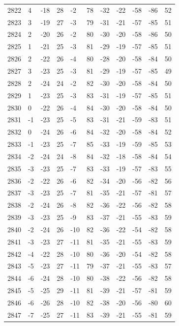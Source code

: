 \begin{table}[H]
\begin{tabular}{lllllllllll}
2822 & 4 & -18 & 28 & -2 & 78 & -32 & -22 & -58 & -86 & 52 \\
2823 & 3 & -19 & 27 & -3 & 79 & -31 & -21 & -57 & -85 & 51 \\
2824 & 2 & -20 & 26 & -2 & 80 & -30 & -20 & -58 & -86 & 50 \\
2825 & 1 & -21 & 25 & -3 & 81 & -29 & -19 & -57 & -85 & 51 \\
2826 & 2 & -22 & 26 & -4 & 80 & -28 & -20 & -58 & -84 & 50 \\
2827 & 3 & -23 & 25 & -3 & 81 & -29 & -19 & -57 & -85 & 49 \\
2828 & 2 & -24 & 24 & -2 & 82 & -30 & -20 & -58 & -84 & 50 \\
2829 & 1 & -23 & 25 & -3 & 83 & -31 & -19 & -57 & -85 & 51 \\
2830 & 0 & -22 & 26 & -4 & 84 & -30 & -20 & -58 & -84 & 50 \\
2831 & -1 & -23 & 25 & -5 & 83 & -31 & -21 & -59 & -83 & 51 \\
2832 & 0 & -24 & 26 & -6 & 84 & -32 & -20 & -58 & -84 & 52 \\
2833 & -1 & -23 & 25 & -7 & 85 & -33 & -19 & -59 & -85 & 53 \\
2834 & -2 & -24 & 24 & -8 & 84 & -32 & -18 & -58 & -84 & 54 \\
2835 & -3 & -23 & 25 & -7 & 83 & -33 & -19 & -57 & -83 & 55 \\
2836 & -2 & -22 & 26 & -6 & 82 & -34 & -20 & -56 & -82 & 56 \\
2837 & -3 & -23 & 25 & -7 & 81 & -35 & -21 & -57 & -81 & 57 \\
2838 & -2 & -24 & 26 & -8 & 82 & -36 & -22 & -56 & -82 & 58 \\
2839 & -3 & -23 & 25 & -9 & 83 & -37 & -21 & -55 & -83 & 59 \\
2840 & -2 & -24 & 26 & -10 & 82 & -36 & -22 & -54 & -82 & 58 \\
2841 & -3 & -23 & 27 & -11 & 81 & -35 & -21 & -55 & -83 & 59 \\
2842 & -4 & -22 & 28 & -10 & 80 & -36 & -20 & -54 & -82 & 58 \\
2843 & -5 & -23 & 27 & -11 & 79 & -37 & -21 & -55 & -83 & 57 \\
2844 & -6 & -24 & 28 & -10 & 80 & -38 & -22 & -56 & -82 & 58 \\
2845 & -5 & -25 & 29 & -11 & 81 & -39 & -21 & -57 & -81 & 59 \\
2846 & -6 & -26 & 28 & -10 & 82 & -38 & -20 & -56 & -80 & 60 \\
2847 & -7 & -25 & 27 & -11 & 83 & -39 & -21 & -55 & -81 & 59 \\

\end{tabular}
\end{table}

